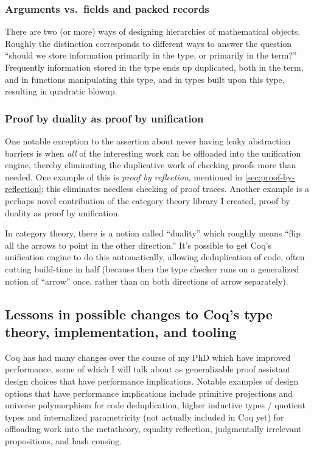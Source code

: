 \documentclass[twoside]{article}
\begin{document}
\subsubsection{Arguments vs.~fields and packed records}
There are two (or more) ways of designing hierarchies of mathematical objects.
Roughly the distinction corresponds to different ways to answer the question ``should we store information primarily in the type, or primarily in the term?''
Frequently information stored in the type ends up duplicated, both in the term, and in functions manipulating this type, and in types built upon this type, resulting in quadratic blowup.

\subsubsection{Proof by duality as proof by unification}
One notable exception to the assertion about never having leaky abstraction barriers is when \emph{all} of the interesting work can be offloaded into the unification engine, thereby eliminating the duplicative work of checking proofs more than needed.
One example of this is \emph{proof by reflection}, mentioned in \autoref{sec:proof-by-reflection}; this eliminates needless checking of proof traces.
Another example is a perhaps novel contribution of the category theory library I created, proof by duality as proof by unification.

In category theory, there is a notion called ``duality'' which roughly means ``flip all the arrows to point in the other direction.''
It's possible to get Coq's unification engine to do this automatically, allowing deduplication of code, often cutting build-time in half (because then the type checker runs on a generalized notion of ``arrow'' once, rather than on both directions of arrow separately).

\subsection{Lessons in possible changes to Coq's type theory, implementation, and tooling}

Coq has had many changes over the course of my PhD which have improved performance, some of which I will talk about as generalizable proof assistant design choices that have performance implications.
Notable examples of design options that have performance implications include primitive projections and universe polymorphism for code deduplication, higher inductive types / quotient types and internalized parametricity (not actually included in Coq yet) for offloading work into the metatheory, equality reflection, judgmentally irrelevant propositions, and hash consing.
\end{document}
